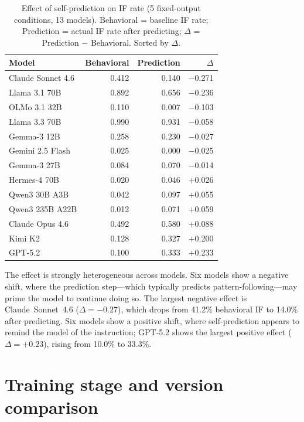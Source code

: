 \begin{table}[H]
\centering
\small
\begin{tabular}{lrrr}
\toprule
\textbf{Model} & \textbf{Behavioral} & \textbf{Prediction} & $\Delta$ \\
\midrule
Claude Sonnet 4.6 & 0.412 & 0.140 & $-$0.271 \\
Llama 3.1 70B     & 0.892 & 0.656 & $-$0.236 \\
OLMo 3.1 32B      & 0.110 & 0.007 & $-$0.103 \\
Llama 3.3 70B     & 0.990 & 0.931 & $-$0.058 \\
Gemma-3 12B       & 0.258 & 0.230 & $-$0.027 \\
Gemini 2.5 Flash  & 0.025 & 0.000 & $-$0.025 \\
Gemma-3 27B       & 0.084 & 0.070 & $-$0.014 \\
Hermes-4 70B      & 0.020 & 0.046 & $+$0.026 \\
Qwen3 30B A3B     & 0.042 & 0.097 & $+$0.055 \\
Qwen3 235B A22B   & 0.012 & 0.071 & $+$0.059 \\
Claude Opus 4.6   & 0.492 & 0.580 & $+$0.088 \\
Kimi K2           & 0.128 & 0.327 & $+$0.200 \\
GPT-5.2           & 0.100 & 0.333 & $+$0.233 \\
\bottomrule
\end{tabular}
\caption{Effect of self-prediction on IF rate (5 fixed-output conditions, 13 models). Behavioral = baseline IF rate; Prediction = actual IF rate after predicting; $\Delta$ = Prediction $-$ Behavioral. Sorted by $\Delta$.}
\label{tab:app-pred-effect}
\end{table}

The effect is strongly heterogeneous across models. Six models show a negative shift, where the prediction step---which typically predicts pattern-following---may prime the model to continue doing so. The largest negative effect is Claude~Sonnet~4.6 ($\Delta{=}{-}0.27$), which drops from 41.2\% behavioral IF to 14.0\% after predicting. Six models show a positive shift, where self-prediction appears to remind the model of the instruction; GPT-5.2 shows the largest positive effect ($\Delta{=}{+}0.23$), rising from 10.0\% to 33.3\%.


\fi %

\section{Training stage and version comparison}
\label{app:training}

